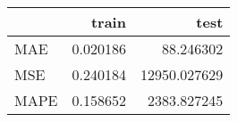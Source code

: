 \begin{tabular}{lrr}
\toprule
{} &     train &          test \\
\midrule
MAE  &  0.020186 &     88.246302 \\
MSE  &  0.240184 &  12950.027629 \\
MAPE &  0.158652 &   2383.827245 \\
\bottomrule
\end{tabular}
